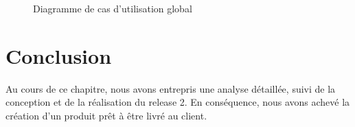 \begin{figure}[H]
  \centering
  \caption{Diagramme de cas d'utilisation global}
  \label{fig:UseCaseDiagramGlobal}
\end{figure}

\section*{Conclusion}
Au cours de ce chapitre, nous avons entrepris une analyse détaillée, suivi de la conception et de la réalisation du release 2. En conséquence, nous avons achevé la création d'un produit prêt à être livré au client.